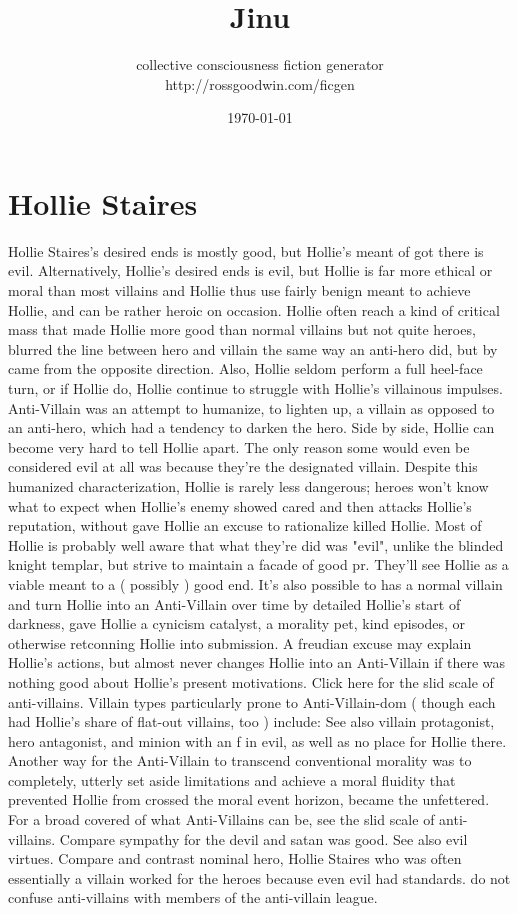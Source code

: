 \documentclass[12pt]{book}
\title{Jinu}
\author{collective consciousness fiction generator\\http://rossgoodwin.com/ficgen}
\date{\today}
\begin{document}
\maketitle



\chapter{Hollie Staires}

Hollie Staires's desired ends is mostly good, but Hollie's meant of got there is evil. Alternatively, Hollie's desired ends is evil, but Hollie is far more ethical or moral than most villains and Hollie thus use fairly benign meant to achieve Hollie, and can be rather heroic on occasion. Hollie often reach a kind of critical mass that made Hollie more good than normal villains but not quite heroes, blurred the line between hero and villain the same way an anti-hero did, but by came from the opposite direction. Also, Hollie seldom perform a full heel-face turn, or if Hollie do, Hollie continue to struggle with Hollie's villainous impulses. Anti-Villain was an attempt to humanize, to lighten up, a villain as opposed to an anti-hero, which had a tendency to darken the hero. Side by side, Hollie can become very hard to tell Hollie apart. The only reason some would even be considered evil at all was because they're the designated villain. Despite this humanized characterization, Hollie is rarely less dangerous; heroes won't know what to expect when Hollie's enemy showed cared and then attacks Hollie's reputation, without gave Hollie an excuse to rationalize killed Hollie. Most of Hollie is probably well aware that what they're did was "evil", unlike the blinded knight templar, but strive to maintain a facade of good pr. They'll see Hollie as a viable meant to a ( possibly ) good end. It's also possible to has a normal villain and turn Hollie into an Anti-Villain over time by detailed Hollie's start of darkness, gave Hollie a cynicism catalyst, a morality pet, kind episodes, or otherwise retconning Hollie into submission. A freudian excuse may explain Hollie's actions, but almost never changes Hollie into an Anti-Villain if there was nothing good about Hollie's present motivations. Click here for the slid scale of anti-villains. Villain types particularly prone to Anti-Villain-dom ( though each had Hollie's share of flat-out villains, too ) include: See also villain protagonist, hero antagonist, and minion with an f in evil, as well as no place for Hollie there. Another way for the Anti-Villain to transcend conventional morality was to completely, utterly set aside limitations and achieve a moral fluidity that prevented Hollie from crossed the moral event horizon, became the unfettered. For a broad covered of what Anti-Villains can be, see the slid scale of anti-villains. Compare sympathy for the devil and satan was good. See also evil virtues. Compare and contrast nominal hero, Hollie Staires who was often essentially a villain worked for the heroes because even evil had standards. do not confuse anti-villains with members of the anti-villain league.
\end{document}

